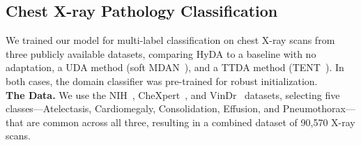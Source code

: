 \documentclass[runningheads]{llncs}
\begin{document}
\subsection{Chest X-ray Pathology Classification}
We trained our model for multi-label classification on chest X-ray scans from three publicly available datasets, comparing HyDA to a baseline with no adaptation, a UDA method (soft MDAN~\cite{Zhao-uda-mdan-2018}), and a TTDA method (TENT~\cite{tta-tent}). In both cases, the domain classifier was pre-trained for robust initialization.\\
\textbf{The Data.} We use the NIH~\cite{cxr-nih}, CheXpert~\cite{cxr-chexpert}, and VinDr~\cite{cxr-vindr} datasets, selecting five classes—Atelectasis, Cardiomegaly, Consolidation, Effusion, and Pneumothorax—that are common across all three, resulting in a combined dataset of 90,570 X-ray scans. 
\end{document}
